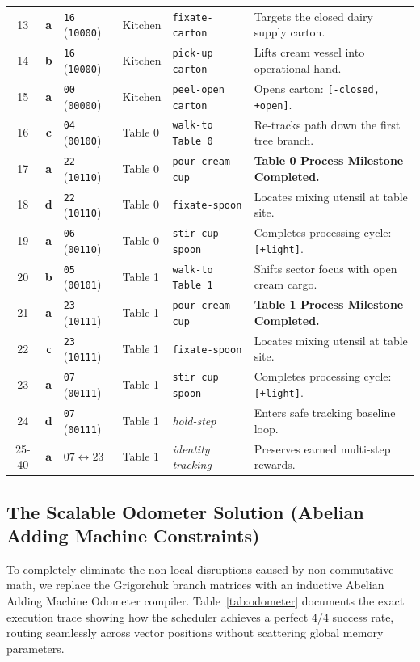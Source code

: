 \documentclass[11pt,journal,onecolumn]{IEEEtran}
\begin{document}
\begin{table}[htbp]
\begin{tabular}{ccllll}
13 & \textbf{a}     & \texttt{16} (\texttt{10000}) & Kitchen & \texttt{fixate-carton}        & Targets the closed dairy supply carton. \\
14 & \textbf{b}     & \texttt{16} (\texttt{10000}) & Kitchen & \texttt{pick-up carton}       & Lifts cream vessel into operational hand. \\
15 & \textbf{a}     & \texttt{00} (\texttt{00000}) & Kitchen & \texttt{peel-open carton}     & Opens carton: \texttt{[-closed, +open]}. \\
16 & \textbf{c}     & \texttt{04} (\texttt{00100}) & Table 0 & \texttt{walk-to Table 0}      & Re-tracks path down the first tree branch. \\
17 & \textbf{a}     & \texttt{22} (\texttt{10110}) & Table 0 & \texttt{pour cream cup}       & \textbf{Table 0 Process Milestone Completed.} \\
18 & \textbf{d}     & \texttt{22} (\texttt{10110}) & Table 0 & \texttt{fixate-spoon}         & Locates mixing utensil at table site. \\
19 & \textbf{a}     & \texttt{06} (\texttt{00110}) & Table 0 & \texttt{stir cup spoon}       & Completes processing cycle: \texttt{[+light]}. \\
20 & \textbf{b}     & \texttt{05} (\texttt{00101}) & Table 1 & \texttt{walk-to Table 1}      & Shifts sector focus with open cream cargo. \\
21 & \textbf{a}     & \texttt{23} (\texttt{10111}) & Table 1 & \texttt{pour cream cup}       & \textbf{Table 1 Process Milestone Completed.} \\
22 & \texttt{c}     & \texttt{23} (\texttt{10111}) & Table 1 & \texttt{fixate-spoon}         & Locates mixing utensil at table site. \\
23 & \textbf{a}     & \texttt{07} (\texttt{00111}) & Table 1 & \texttt{stir cup spoon}       & Completes processing cycle: \texttt{[+light]}. \\
24 & \textbf{d}     & \texttt{07} (\texttt{00111}) & Table 1 & \textit{hold-step}            & Enters safe tracking baseline loop. \\
25-40 & $\mathbf{a}$ & $07 \leftrightarrow 23$     & Table 1 & \textit{identity tracking}    & Preserves earned multi-step rewards. \\
\bottomrule
\end{tabular}
\end{table}

\subsection{The Scalable Odometer Solution (Abelian Adding Machine Constraints)}
To completely eliminate the non-local disruptions caused by non-commutative math, we replace the Grigorchuk branch matrices with an inductive Abelian Adding Machine Odometer compiler. Table~\ref{tab:odometer} documents the exact execution trace showing how the scheduler achieves a perfect 4/4 success rate, routing seamlessly across vector positions without scattering global memory parameters.
\end{document}
